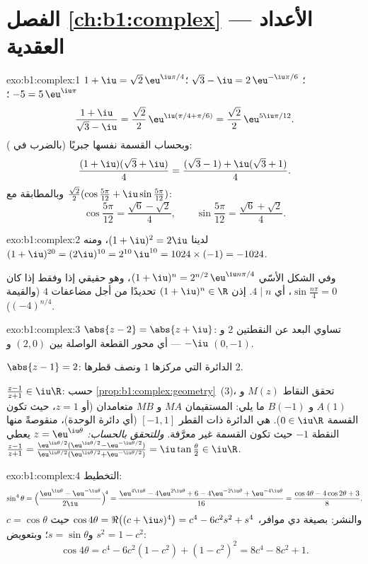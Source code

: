 \section*{الفصل \ref{ch:b1:complex} --- الأعداد العقدية}

\begin{solution}{exo:b1:complex:1}
$1 + \iu = \sqrt 2\, \eu^{\iu\pi/4}$؛
$\;\sqrt 3 - \iu = 2\, \eu^{-\iu\pi/6}$؛
$\;-5 = 5\, \eu^{\iu\pi}$؛
\[
\frac{1 + \iu}{\sqrt 3 - \iu}
= \frac{\sqrt 2}{2}\, \eu^{\iu(\pi/4 + \pi/6)}
= \frac{\sqrt 2}{2}\, \eu^{5\iu\pi/12}.
\]
وبحساب القسمة نفسها جبريًا (بالضرب في ):
\[
\frac{(1 + \iu)(\sqrt 3 + \iu)}{4}
= \frac{(\sqrt 3 - 1) + \iu(\sqrt 3 + 1)}{4}.
\]
وبالمطابقة مع $\frac{\sqrt 2}{2}(\cos\frac{5\pi}{12} +
\iu\sin\frac{5\pi}{12})$:
\[
\cos\frac{5\pi}{12} = \frac{\sqrt 6 - \sqrt 2}{4},
\qquad
\sin\frac{5\pi}{12} = \frac{\sqrt 6 + \sqrt 2}{4}.
\]
\end{solution}

\begin{solution}{exo:b1:complex:2}
لدينا $(1+\iu)^2 = 2\iu$، ومنه $(1+\iu)^{20} = (2\iu)^{10} = 2^{10}\,\iu^{10}
= 1024 \times (-1) = -1024$.

وفي الشكل الأسّي $(1+\iu)^n = 2^{n/2}\, \eu^{\iu n\pi/4}$، وهو حقيقي إذا
وفقط إذا كان $\sin\frac{n\pi}{4} = 0$، أي $4 \mid n$. إذن $(1+\iu)^n
\in \R$ تحديدًا من أجل مضاعفات $4$ (والقيمة $(-4)^{n/4}$).
\end{solution}

\begin{solution}{exo:b1:complex:3}
$\abs{z - 2} = \abs{z + \iu}$: تساوي البعد عن النقطتين $2$ و
$-\iu$ --- أي محور القطعة الواصلة بين $(2, 0)$
و $(0, -1)$.

$\abs{z - 1} = 2$: الدائرة التي مركزها $1$ ونصف قطرها $2$.

$\frac{z-1}{z+1} \in \iu\R$: حسب
\cref{prop:b1:complex:geometry}~(3)، تحقق النقاط $M(z)$ و $A(1)$ و
$B(-1)$ ما يلي: المستقيمان $MA$ و $MB$ متعامدان (أو $z = 1$، حيث
تكون القسمة $0 \in \iu\R$).  هي الدائرة ذات القطر
$[-1, 1]$ (أي دائرة الوحدة)، منقوصةً منها النقطة $-1$ حيث تكون
القسمة غير معرَّفة. \emph{وللتحقق بالحساب:} $z = \eu^{\iu\theta}$ يعطي
$\frac{z-1}{z+1} = \frac{\eu^{\iu\theta/2}(\eu^{\iu\theta/2} -
\eu^{-\iu\theta/2})}{\eu^{\iu\theta/2}(\eu^{\iu\theta/2} +
\eu^{-\iu\theta/2})} = \iu\tan\frac\theta2 \in \iu\R$.
\end{solution}

\begin{solution}{exo:b1:complex:4}
التخطيط:
\[
\sin^4\theta
= \Bigl(\frac{\eu^{\iu\theta} - \eu^{-\iu\theta}}{2\iu}\Bigr)^{\!4}
= \frac{\eu^{4\iu\theta} - 4\eu^{2\iu\theta} + 6 - 4\eu^{-2\iu\theta}
+ \eu^{-4\iu\theta}}{16}
= \frac{\cos 4\theta - 4\cos 2\theta + 3}{8}.
\]
والنشر: بصيغة دي موافر، $\cos 4\theta = \Re\bigl((c +
\iu s)^4\bigr) = c^4 - 6c^2 s^2 + s^4$ حيث $c = \cos\theta$ و$s =
\sin\theta$؛ وبتعويض $s^2 = 1 - c^2$:
\[
\cos 4\theta = c^4 - 6c^2(1 - c^2) + (1 - c^2)^2
= 8c^4 - 8c^2 + 1 .
\]
\end{solution}

